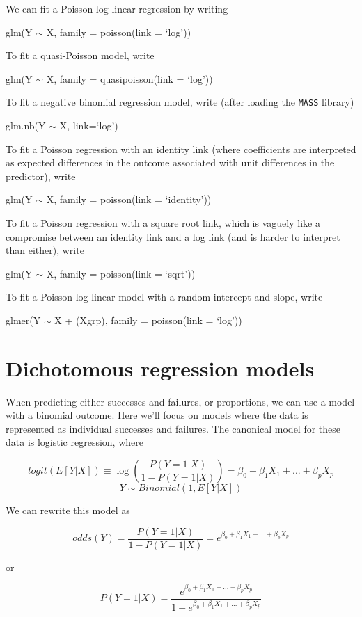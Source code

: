 \documentclass[
  letterpaper,
  DIV=11,
  numbers=noendperiod]{scrreprt}
\begin{document}
We can fit a Poisson log-linear regression by writing

glm(Y \(\sim\) X, family = poisson(link = `log'))

To fit a quasi-Poisson model, write

glm(Y \(\sim\) X, family = quasipoisson(link = `log'))

To fit a negative binomial regression model, write (after loading the
\texttt{MASS} library)

glm.nb(Y \(\sim\) X, link=`log')

To fit a Poisson regression with an identity link (where coefficients
are interpreted as expected differences in the outcome associated with
unit differences in the predictor), write

glm(Y \(\sim\) X, family = poisson(link = `identity'))

To fit a Poisson regression with a square root link, which is vaguely
like a compromise between an identity link and a log link (and is harder
to interpret than either), write

glm(Y \(\sim\) X, family = poisson(link = `sqrt'))

To fit a Poisson log-linear model with a random intercept and slope,
write

glmer(Y \(\sim\) X + (X\textbar grp), family = poisson(link = `log'))

\hypertarget{dichotomous-regression-models}{%
\section{Dichotomous regression
models}\label{dichotomous-regression-models}}

When predicting either successes and failures, or proportions, we can
use a model with a binomial outcome. Here we'll focus on models where
the data is represented as individual successes and failures. The
canonical model for these data is logistic regression, where

\[logit(E[Y|X]) \equiv \log\left(\frac{P(Y=1|X)}{1-P(Y=1|X)}\right) = \beta_0 + \beta_1X_1 + ... + \beta_pX_p\]
\[Y \sim Binomial(1, E[Y|X])\]

We can rewrite this model as

\[odds(Y) = \frac{P(Y=1|X)}{1-P(Y=1|X)} = e^{\beta_0 + \beta_1X_1 + ... + \beta_pX_p}\]

or

\[P(Y=1|X) = \frac{e^{\beta_0 + \beta_1X_1 + ... + \beta_pX_p}}{1 + e^{\beta_0 + \beta_1X_1 + ... + \beta_pX_p}}\]
\end{document}
